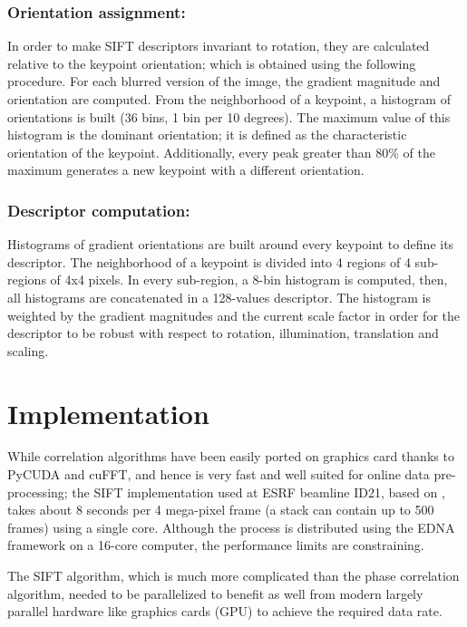 \documentclass[preprint]{iucr}
\begin{document}
\subsubsection{Orientation assignment:}
In order to make SIFT descriptors invariant to rotation, they are calculated
relative to the keypoint orientation; which is obtained using the following
procedure.
For each blurred version of the image, the gradient magnitude and orientation
are computed.
From the neighborhood of a keypoint, a histogram of orientations is built (36
bins, 1 bin per 10 degrees).
The maximum value of this histogram is the dominant orientation; it is defined
as the characteristic orientation of the keypoint.
Additionally, every peak greater than 80\% of the maximum generates a new
keypoint with a different orientation.


\subsubsection{Descriptor computation:}
Histograms of gradient orientations are built around every keypoint to define
its descriptor.
The neighborhood of a keypoint is divided into 4 regions of 4 sub-regions of 4x4
pixels.
In every sub-region, a 8-bin histogram is computed, then, all histograms
are concatenated in a 128-values descriptor.
The histogram is weighted by the gradient magnitudes and the current scale
factor in order for the descriptor to be robust with respect to rotation,
illumination, translation and scaling.


\section{Implementation}

While correlation algorithms have been easily ported on
graphics card thanks to PyCUDA \cite{pyopencl} and cuFFT, and hence is very fast and well
suited for online data pre-processing;
the SIFT implementation used at ESRF beamline ID21, based on \cite{ASIFT},
takes about 8 seconds per 4 mega-pixel frame  (a stack can contain up to  500
frames) using a single core.
Although the process is distributed using the EDNA framework \cite{edna} on a
16-core computer, the performance limits are constraining.

The SIFT algorithm, which is much more complicated than the phase
correlation algorithm, needed to be parallelized to benefit as well from modern
largely parallel hardware like graphics cards (GPU) to achieve the required
data rate.
\end{document}
